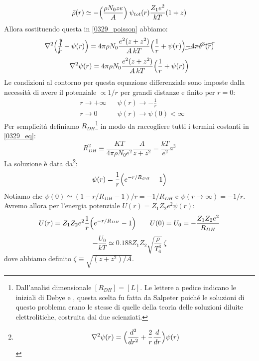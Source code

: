 \begin{equation}\label{0329_rho}
    \bar{\rho} (r) \simeq - \Bigl ( \frac{\rho N_0ze}{A} \Bigr )\: \psi_{tot}(r) \frac{Z_1e^2}{kT} (1+z)
\end{equation}
Allora sostituendo questa in \eqref{0329_poisson} abbiamo:
$$\nabla^2 \Bigl ( \cancel{\frac{1}{r}} + \psi(r) \Bigr ) = 4\pi \rho N_0 \frac{e^2(z+z^2)}{A\, kT}  \Bigl ( \frac{1}{r} +\psi(r) \Bigr ) \cancel{-4\pi \delta^3(r)}$$
\begin{equation}\label{0329_eq}
    \nabla^2 \psi(r) = 4\pi \rho N_0 \frac{e^2(z+z^2)}{A\, kT}  \Bigl ( \frac{1}{r} +\psi(r) \Bigr )
\end{equation}
Le condizioni al contorno per questa equazione differenziale sono imposte dalla necessità di avere il potenziale $\propto 1/r$ per grandi distanze e finito per $r=0$:
\begin{displaymath}
\begin{aligned}
&r\to +\infty & &\psi(r) \to -\frac{1}{r}\\
&r\to 0 & &\psi(r) \to \psi(0)<\infty
\end{aligned}
\end{displaymath}
Per semplicità definiamo $R_{DH}$\footnote{Dall'analisi dimensionale $[R_{DH}] = [L]$. Le lettere a pedice indicano le iniziali di Debye e \Huckel{}, questa scelta fu fatta da Salpeter poiché le soluzioni di questo problema erano le stesse di quelle della teoria delle soluzioni diluite elettrolitiche, costruita dai due scienziati.} in modo da raccogliere tutti i termini costanti in \eqref{0329_eq}:
$$R_{DH}^2 \equiv \frac{KT}{4\pi \rho N_0e^2} \frac{A}{z+z^2} = \frac{kT}{e^2} a^3$$
La soluzione è data da\footnote{$$\nabla^2 \psi(r) = \Bigl ( \frac{d^2}{dr^2} + \frac{2}{r}\frac{d}{dr} \Bigr )\psi(r)$$}:
$$\psi(r) = \frac{1}{r}\Bigl ( e^{-r/R_{DH}}-1 \Bigr )$$
Notiamo che $\psi(0)\simeq (1-r/R_{DH}-1)/r=-1/R_{DH}$ e $\psi(r\to\infty)=-1/r$. Avremo allora per l'energia potenziale $U(r) = Z_1Z_2 e^2 \psi(r)$:
$$U(r) = Z_1Z_2 e^2 \frac{1}{r} \Bigl ( e^{-r/R_{DH}}-1 \Bigr ) \qquad U(0)=U_0 = -\frac{Z_1Z_2 e^2}{R_{DH}}$$
\begin{equation}\label{0329_U0}
-\frac{U_0}{kT}\simeq 0.188 Z_1Z_2 \sqrt{\frac{\rho}{T_6^3}}\,\zeta
\end{equation}
dove abbiamo definito $\zeta\equiv \sqrt{(z+z^2)/A}$.

